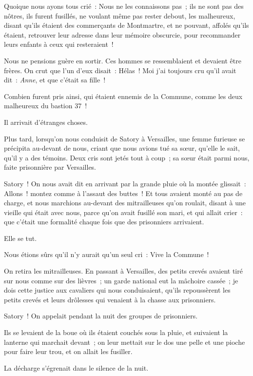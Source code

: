 \documentclass[french,twoside]{book} %
\begin{document}
Quoique nous ayons tous crié : Nous ne les connaissons pas ; ils ne sont pas des nôtres, ils furent fusillés, ne voulant même pas rester debout, les malheureux, disant qu’ils étaient des commerçants de Montmartre, et ne pouvant, affolés qu’ils étaient, retrouver leur adresse dans leur mémoire obscurcie, pour recommander leurs enfants à ceux qui resteraient !\par
Nous ne pensions guère en sortir. Ces hommes se ressemblaient et devaient être frères. On crut que l’un d’eux disait : Hélas ! Moi j’ai toujours cru qu’il avait dit : \emph{Anne}, et que c’était sa fille !\par
Combien furent pris ainsi, qui étaient ennemis de la Commune, comme les deux malheureux du bastion 37 !\par
Il arrivait d’étranges choses.\par
Plus tard, lorsqu’on nous conduisit de Satory à Versailles, une femme furieuse se précipita au-devant de nous, criant que nous avions tué sa sœur, qu’elle le sait, qu’il y a des témoins. Deux cris sont jetés tout à coup ; sa sœur était parmi nous, faite prisonnière par Versailles.\par
Satory ! On nous avait dit en arrivant par la grande pluie où la montée glissait : Allons ! montez  comme à l’assaut des buttes ! Et tous avaient monté au pas de charge, et nous marchions au-devant des mitrailleuses qu’on roulait, disant à une vieille qui était avec nous, parce qu’on avait fusillé son mari, et qui allait crier : que c’était une formalité chaque fois que des prisonniers arrivaient.\par
Elle se tut.\par
Nous étions sûrs qu’il n’y aurait qu’un seul cri : Vive la Commune !\par
On retira les mitrailleuses. En passant à Versailles, des petits crevés avaient tiré sur nous comme sur des lièvres ; un garde national eut la mâchoire cassée ; je dois cette justice aux cavaliers qui nous conduisaient, qu’ils repoussèrent les petits crevés et leurs drôlesses qui venaient à la chasse aux prisonniers.\par
Satory ! On appelait pendant la nuit des groupes de prisonniers.\par
Ils se levaient de la boue où ils étaient couchés sous la pluie, et suivaient la lanterne qui marchait devant ; on leur mettait sur le dos une pelle et une pioche pour faire leur trou, et on allait les fusiller.\par
La décharge s’égrenait dans le silence de la nuit.\par
\end{document}
